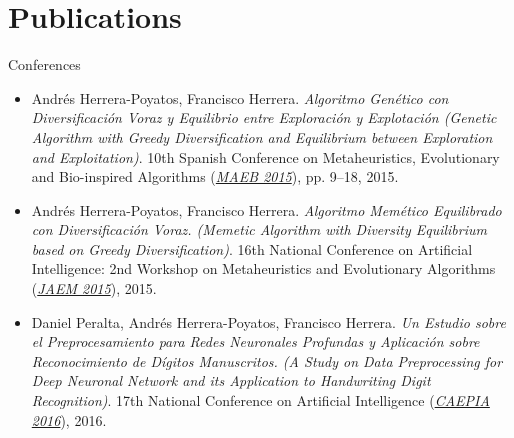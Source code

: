 \documentclass[10pt,a4paper,sans]{moderncv} %
\begin{document}
	
	


\section{Publications}

	{\large \textcolor{color1}{Conferences}}

		\begin{itemize}
			\item  Andrés Herrera-Poyatos, Francisco Herrera. \textit{Algoritmo Genético con Diversificación Voraz y Equilibrio entre Exploración y Explotación (Genetic Algorithm with Greedy Diversification and Equilibrium between Exploration and Exploitation)}. 10th Spanish Conference on Metaheuristics, Evolutionary and Bio-inspired Algorithms (\textcolor{color1}{\textit{\href{http://www.eweb.unex.es/eweb/maeb2015/}{MAEB 2015}}}), pp. 9--18, 2015.
		\end{itemize}

		\begin{itemize}
			\item  Andrés Herrera-Poyatos, Francisco Herrera. \textit{Algoritmo Memético Equilibrado con Diversificación Voraz. (Memetic Algorithm with Diversity Equilibrium based on Greedy Diversification)}. 16th National Conference on Artificial Intelligence: 2nd Workshop on Metaheuristics and Evolutionary Algorithms (\textcolor{color1}{\textit{\href{http://simd.albacete.org/caepia15/conferencia/jaem2015/}{JAEM 2015}}}), 2015.
		\end{itemize}

		\begin{itemize}
			\item Daniel Peralta, Andrés Herrera-Poyatos, Francisco Herrera. \textit{Un Estudio sobre el Preprocesamiento para Redes Neuronales Profundas y Aplicación sobre Reconocimiento de Dígitos Manuscritos. (A Study on Data Preprocessing for Deep Neuronal Network and its Application to Handwriting Digit Recognition)}. 17th National Conference on Artificial Intelligence (\textcolor{color1}{\textit{\href{http://www.congresocedi.es/es/caepia}{CAEPIA 2016}}}), 2016.
		\end{itemize}
\end{document}
